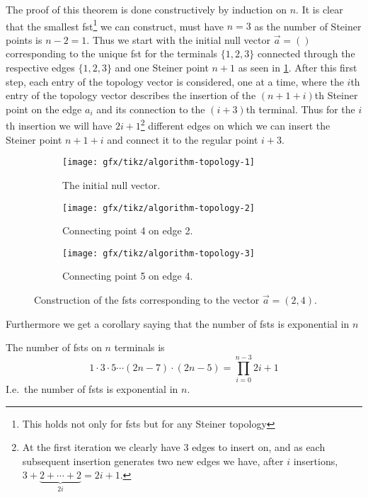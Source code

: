 The proof of this theorem is done constructively by induction on $n$. It is
clear that the smallest \ac{fst}\footnote{This holds not only for \acp{fst}
  but for any Steiner topology} we can construct, must have $n = 3$ as the
number of Steiner points is $n - 2 = 1$. Thus we start with the initial null
vector $\vec{a} = ()$ corresponding to the unique \ac{fst} for the terminals
$\{1, 2, 3\}$ connected through the respective edges $\{1, 2, 3\}$ and one
Steiner point $n+1$ as seen in \cref{fig:algorithm-topology-1}. After this
first step, each entry of the topology vector is considered, one at a time,
where the $i$th entry of the topology vector describes the insertion of the
$(n+1+i)$th Steiner point on the edge $a_{i}$ and its connection to the
$(i+3)$th terminal. Thus for the $i$th insertion we will have
$2i+1$\footnote{At the first iteration we clearly have $3$ edges to insert on, and
  as each subsequent insertion generates two new edges we have, after $i$
  insertions, $3 + \underbrace{2 + \cdots + 2}_{2 i} = 2 i + 1$.} different
edges on which we can insert the Steiner point $n + 1 + i$ and connect it to the
regular point $i+3$.

\begin{figure}[htbp] \centering
  \begin{subfigure}[t]{0.267\textwidth}
    \texttt{[image: gfx/tikz/algorithm-topology-1]}
    \caption{The initial null vector.\label{fig:algorithm-topology-1}}
  \end{subfigure}\hspace{1em}%
  \begin{subfigure}[t]{0.267\textwidth}
    \texttt{[image: gfx/tikz/algorithm-topology-2]}
    \caption{Connecting point 4 on edge 2.\label{fig:algorithm-topology-2}}
  \end{subfigure}\hspace{1em}%
  \begin{subfigure}[t]{0.267\textwidth}
    \texttt{[image: gfx/tikz/algorithm-topology-3]}
    \caption{Connecting point 5 on edge 4.\label{fig:algorithm-topology-3}}
  \end{subfigure}
  \caption[Construction of FSTs]{Construction of the \acp{fst} corresponding
to the vector $\vec{a} = (2, 4)$.\label{fig:algorithm-topologies}}
\end{figure}

Furthermore we get a corollary saying that the number of \acp{fst} is
exponential in $n$

\begin{corollary}
\label{cor:number-of-fsts}
The number of \acp{fst} on $n$ terminals is
%
\[
  1 \cdot 3 \cdot 5 \cdots (2n - 7) \cdot (2n - 5) = \prod_{i=0}^{n-3} 2i+1
\]
%
I.e.\ the number of \acp{fst} is exponential in $n$.
\end{corollary}


